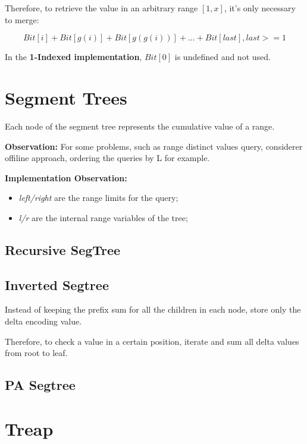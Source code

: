     Therefore, to retrieve the value in an arbitrary range $[1, x]$, it's only necessary to merge:

        $$ Bit[i] + Bit[g(i)] + Bit[g(g(i))] + ... + Bit[last], last >= 1$$

    In the \textbf{1-Indexed implementation}, $Bit[0]$ is undefined and not used.

    

\section{Segment Trees}

    Each node of the segment tree represents the cumulative value of a range.

    \textbf{Observation:} For some problems, such as range distinct values query,
    considerer offiline approach, ordering the queries by L for example. 

    \textbf{Implementation Observation:}
    \begin{itemize}
    \item \textit{left/right} are the range limits for the query;
    \item \textit{l/r} are the internal range variables of the tree;
    \end{itemize}

    \subsection{Recursive SegTree}



    \subsection{Inverted Segtree}

        Instead of keeping the prefix sum for all the children in each node, store only the delta encoding value.

        Therefore, to check a value in a certain position, iterate and sum all delta values from root to leaf.


    \subsection{PA Segtree}


\section{Treap}

